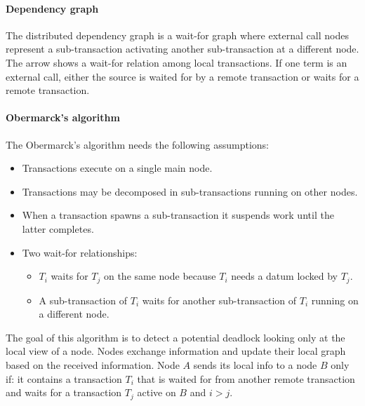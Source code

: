 \paragraph*{Dependency graph}
The distributed dependency graph is a wait-for graph where external call nodes represent a sub-transaction activating another sub-transaction at a different node. 
The arrow shows a wait-for relation among local transactions. 
If one term is an external call, either the source is waited for by a remote transaction or waits for a remote transaction. 

\paragraph*{Obermarck's algorithm}
The Obermarck's algorithm needs the following assumptions: 
\begin{itemize}
    \item Transactions execute on a single main node. 
    \item Transactions may be decomposed in sub-transactions running on other nodes. 
    \item When a transaction spawns a sub-transaction it suspends work until the latter completes. 
    \item Two wait-for relationships:
        \begin{itemize}
            \item $T_i$ waits for $T_j$ on the same node because $T_i$ needs a datum locked by $T_j$. 
            \item A sub-transaction of $T_i$ waits for another sub-transaction of $T_i$ running on a different node. 
        \end{itemize}
\end{itemize}
The goal of this algorithm is to detect a potential deadlock looking only at the local view of a node. 
Nodes exchange information and update their local graph based on the received information. 
Node $A$ sends its local info to a node $B$ only if: it contains a transaction $T_i$ that is waited for from another remote transaction and waits for a transaction $T_j$ active on $B$ and $i>j$.

